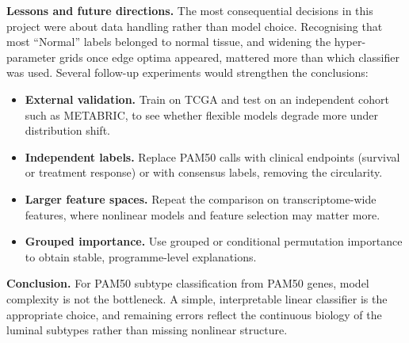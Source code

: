 \documentclass[10pt,twocolumn]{article}
\begin{document}
\textbf{Lessons and future directions.} The most consequential decisions in this project were about data handling rather than model choice. Recognising that most ``Normal'' labels belonged to normal tissue, and widening the hyper-parameter grids once edge optima appeared, mattered more than which classifier was used. Several follow-up experiments would strengthen the conclusions:
\begin{itemize}
\item \textbf{External validation.} Train on TCGA and test on an independent cohort such as METABRIC, to see whether flexible models degrade more under distribution shift.
\item \textbf{Independent labels.} Replace PAM50 calls with clinical endpoints (survival or treatment response) or with consensus labels, removing the circularity.
\item \textbf{Larger feature spaces.} Repeat the comparison on transcriptome-wide features, where nonlinear models and feature selection may matter more.
\item \textbf{Grouped importance.} Use grouped or conditional permutation importance to obtain stable, programme-level explanations.
\end{itemize}

\textbf{Conclusion.} For PAM50 subtype classification from PAM50 genes, model complexity is not the bottleneck. A simple, interpretable linear classifier is the appropriate choice, and remaining errors reflect the continuous biology of the luminal subtypes rather than missing nonlinear structure.
\end{document}
